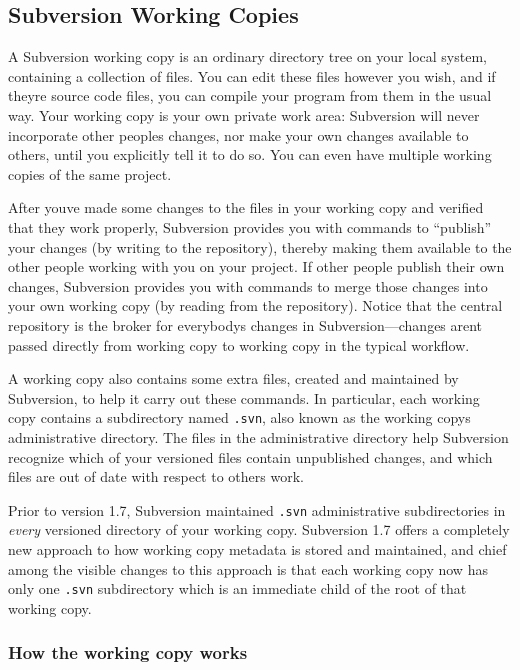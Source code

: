 \subsection{Subversion Working Copies}\label{svn.basic.in-action.wc}

A Subversion working copy is an ordinary directory tree on your local
system, containing a collection of files. You can edit these files
however you wish, and if they\textquotesingle re source code files, you
can compile your program from them in the usual way. Your working copy
is your own private work area: Subversion will never incorporate other
people\textquotesingle s changes, nor make your own changes available to
others, until you explicitly tell it to do so. You can even have
multiple working copies of the same project.

After you\textquotesingle ve made some changes to the files in your
working copy and verified that they work properly, Subversion provides
you with commands to ``publish'' your changes (by writing to the
repository), thereby making them available to the other people working
with you on your project. If other people publish their own changes,
Subversion provides you with commands to merge those changes into your
own working copy (by reading from the repository). Notice that the
central repository is the broker for everybody\textquotesingle s changes
in Subversion---changes aren\textquotesingle t passed directly from
working copy to working copy in the typical workflow.

A working copy also contains some extra files, created and maintained by
Subversion, to help it carry out these commands. In particular, each
working copy contains a subdirectory named \texttt{.svn}, also known as
the working copy\textquotesingle s administrative directory. The files
in the administrative directory help Subversion recognize which of your
versioned files contain unpublished changes, and which files are out of
date with respect to others\textquotesingle{} work.

Prior to version 1.7, Subversion maintained \texttt{.svn} administrative
subdirectories in \emph{every} versioned directory of your working copy.
Subversion 1.7 offers a completely new approach to how working copy
metadata is stored and maintained, and chief among the visible changes
to this approach is that each working copy now has only one
\texttt{.svn} subdirectory which is an immediate child of the root of
that working copy.

\subsubsection{How the working copy
works}\label{svn.basic.in-action.track-repos}

